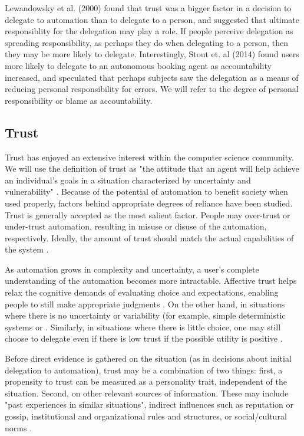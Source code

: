 \documentclass[letterpaper]{article} %
\begin{document}
Lewandowsky et al. (2000) found that trust was a bigger factor in a decision to delegate to automation than to delegate to a person, and suggested that ultimate responsiblity for the delegation may play a role. If people perceive delegation as spreading responsibility, as perhaps they do when delegating to a person, then they may be more likely to delegate. Interestingly, Stout et. al (2014) found users more likely to delegate to an autonomous booking agent as accountability increased, and speculated that perhaps subjects saw the delegation as a means of reducing personal responsibility for errors. We will refer to the degree of personal responsibility or blame as accountability. 

\subsection{Trust}
Trust has enjoyed an extensive interest within the computer science community. We will use the definition of trust as "the attitude that an agent will help achieve an individual's goals in a situation characterized by uncertainty and vulnerability" \cite{lee}. Because of the potential of automation to benefit society when used properly, factors behind appropriate degrees of reliance have been studied. Trust is generally accepted as the most salient factor. People may over-trust or under-trust automation, resulting in misuse or disuse of the automation, respectively. Ideally, the amount of trust should match the actual capabilities of the system \cite{lee}. 

As automation grows in complexity and uncertainty, a user's complete understanding of the automation becomes more intractable. Affective trust helps relax the cognitive demands of evaluating choice and expectations, enabling people to still make appropriate judgments \cite{lee}. On the other hand, in situations where there is no uncertainty or variability (for example, simple deterministic systems or . Similarly, in situations where there is little choice, one may still choose to delegate even if there is low trust if the possible utility is positive \cite{}. 

Before direct evidence is gathered on the situation (as in decisions about initial delegation to automation), trust may be a combination of two things: first, a propensity to trust can be measured as a personality trait, independent of the situation. Second, on other relevant sources of information. These may include "past experiences in similar situations", indirect influences such as reputation or gossip, institutional and organizational rules and structures, or social/cultural norms \cite{lee}.
\end{document}
